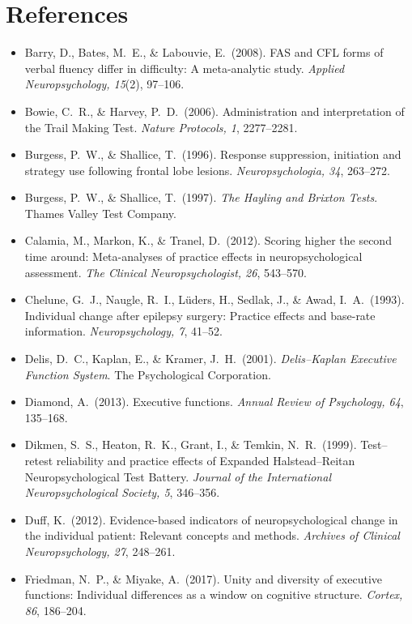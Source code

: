 \documentclass[11pt,a4paper]{article}
\begin{document}
\section*{References}
\begin{small}
\begin{itemize}[leftmargin=1.2em,itemsep=2pt]
\item Barry, D., Bates, M.\ E., \& Labouvie, E.\ (2008). FAS and CFL forms of verbal fluency differ in difficulty: A meta-analytic study. \emph{Applied Neuropsychology, 15}(2), 97--106.
\item Bowie, C.\ R., \& Harvey, P.\ D.\ (2006). Administration and interpretation of the Trail Making Test. \emph{Nature Protocols, 1}, 2277--2281.
\item Burgess, P.\ W., \& Shallice, T.\ (1996). Response suppression, initiation and strategy use following frontal lobe lesions. \emph{Neuropsychologia, 34}, 263--272.
\item Burgess, P.\ W., \& Shallice, T.\ (1997). \emph{The Hayling and Brixton Tests}. Thames Valley Test Company.
\item Calamia, M., Markon, K., \& Tranel, D.\ (2012). Scoring higher the second time around: Meta-analyses of practice effects in neuropsychological assessment. \emph{The Clinical Neuropsychologist, 26}, 543--570.
\item Chelune, G.\ J., Naugle, R.\ I., L\"uders, H., Sedlak, J., \& Awad, I.\ A.\ (1993). Individual change after epilepsy surgery: Practice effects and base-rate information. \emph{Neuropsychology, 7}, 41--52.
\item Delis, D.\ C., Kaplan, E., \& Kramer, J.\ H.\ (2001). \emph{Delis--Kaplan Executive Function System}. The Psychological Corporation.
\item Diamond, A.\ (2013). Executive functions. \emph{Annual Review of Psychology, 64}, 135--168.
\item Dikmen, S.\ S., Heaton, R.\ K., Grant, I., \& Temkin, N.\ R.\ (1999). Test--retest reliability and practice effects of Expanded Halstead--Reitan Neuropsychological Test Battery. \emph{Journal of the International Neuropsychological Society, 5}, 346--356.
\item Duff, K.\ (2012). Evidence-based indicators of neuropsychological change in the individual patient: Relevant concepts and methods. \emph{Archives of Clinical Neuropsychology, 27}, 248--261.
\item Friedman, N.\ P., \& Miyake, A.\ (2017). Unity and diversity of executive functions: Individual differences as a window on cognitive structure. \emph{Cortex, 86}, 186--204.

\end{itemize}
\end{small}
\end{document}
